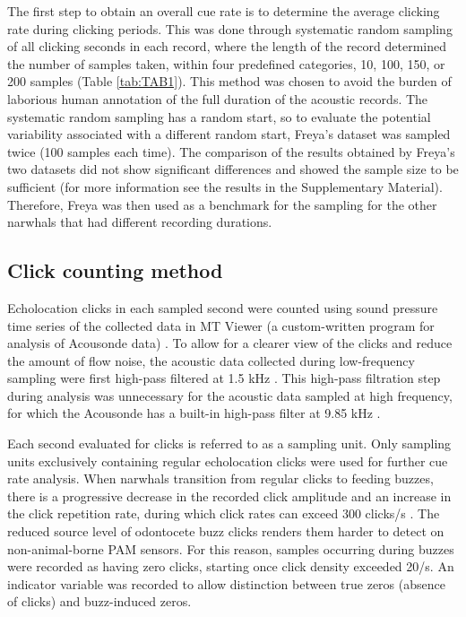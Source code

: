 \documentclass[preprint]{JASA}
\begin{document}
The first step to obtain an overall cue rate is to determine the average clicking rate during clicking periods.  This was done through systematic random sampling of all clicking seconds in each record, where the length of the record determined the number of samples taken, within four predefined categories, 10, 100, 150, or 200 samples (Table \ref{tab:TAB1}). This method was chosen to avoid the burden of laborious human annotation of the full duration of the acoustic records. The systematic random sampling has a random start, so to evaluate the potential variability associated with a different random start, Freya’s dataset was sampled twice (100 samples each time). The comparison of the results obtained by Freya’s two datasets did not show significant differences and showed the sample size to be sufficient (for more information see the results in the Supplementary Material). Therefore, Freya was then used as a benchmark for the sampling for the other narwhals that had different recording durations.


\subsection{\label{sec:2:6} Click counting method}

Echolocation clicks  in each sampled second were counted using sound pressure time series of the collected data in MT Viewer (a custom-written program for analysis of Acousonde data) \citep{Burgess_1998}. To allow for a clearer view of the clicks and reduce the amount of flow noise, the acoustic data collected during low-frequency sampling were first high-pass filtered at 1.5 kHz \citep{blackwell2018}. This high-pass filtration step during analysis was unnecessary for the acoustic data sampled at high frequency, for which the Acousonde has a built-in high-pass filter at 9.85 kHz \citep{blackwell2018}.

Each second evaluated for clicks is referred to as a sampling unit. Only sampling units exclusively containing regular echolocation clicks were used for further cue rate analysis. When narwhals transition from regular clicks to feeding buzzes, there is a progressive decrease in the recorded click amplitude and an increase in the click repetition rate, during which click rates can exceed 300 clicks/s \citep{Rasmussen_2015}. The reduced source level of odontocete buzz clicks renders them harder to detect on non-animal-borne PAM sensors. For this reason, samples occurring during buzzes were recorded as having zero clicks, starting once click density exceeded 20/s. An indicator variable was recorded to allow distinction between true zeros (absence of clicks) and buzz-induced zeros. 
\end{document}
